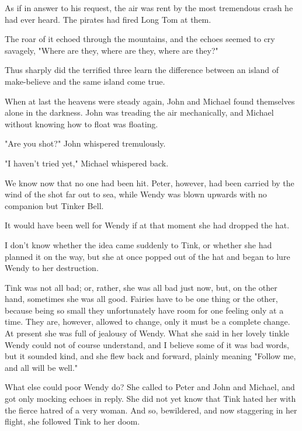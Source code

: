 As if in answer to his request, the air was rent by the most tremendous crash he had ever heard.
The pirates had fired Long Tom at them.

The roar of it echoed through the mountains, and the echoes seemed to cry savagely, "Where are they, where are they, where are they?"

Thus sharply did the terrified three learn the difference between an island of make-believe and the same island come true.

When at last the heavens were steady again, John and Michael found themselves alone in the darkness.
John was treading the air mechanically, and Michael without knowing how to float was floating.

"Are you shot?\@" John whispered tremulously.

"I haven't tried yet," Michael whispered back.

We know now that no one had been hit.
Peter, however, had been carried by the wind of the shot far out to sea, while Wendy was blown upwards with no companion but Tinker Bell.

It would have been well for Wendy if at that moment she had dropped the hat.

I don't know whether the idea came suddenly to Tink, or whether she had planned it on the way, but she at once popped out of the hat and began to lure Wendy to her destruction.

Tink was not all bad;
or, rather, she was all bad just now, but, on the other hand, sometimes she was all good.
Fairies have to be one thing or the other, because being so small they unfortunately have room for one feeling only at a time.
They are, however, allowed to change, only it must be a complete change.
At present she was full of jealousy of Wendy.
What she said in her lovely tinkle Wendy could not of course understand, and I believe some of it was bad words, but it sounded kind, and she flew back and forward, plainly meaning "Follow me, and all will be well."

What else could poor Wendy do?
She called to Peter and John and Michael, and got only mocking echoes in reply.
She did not yet know that Tink hated her with the fierce hatred of a very woman.
And so, bewildered, and now staggering in her flight, she followed Tink to her doom.
